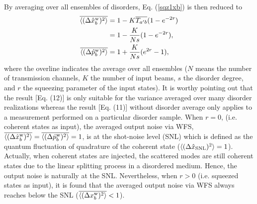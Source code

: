 \documentclass[9pt,twocolumn,twoside]{osajnl}
\begin{document}
By averaging over all ensembles of disorders, Eq. (\ref{sqz1xb}) is then reduced to
\begin{align}
\label{sqz1xbm}
\overline{\langle(\Delta \hat{x}_b^{\rm{w}})^2\rangle} &= 1 - K \overline{T_{a'b}} (1 - e^{-2r}) \\ \nonumber
&= 1 - \frac{K}{Ns} (1 - e^{-2r}), \\ \nonumber
\overline{\langle(\Delta \hat{p}_b^{\rm{w}})^2\rangle} &= 1 + \frac{K}{Ns}  (e^{2r} - 1),
\end{align}
where the overline indicates the average over all ensembles ($N$ means the number of transmission channels, $K$ the number of input beams, $s$ the disorder degree, and $r$ the squeezing parameter of the input states). It is worthy pointing out that the result [Eq. (12)] is only suitable for the variance averaged over many disorder realizations whereas the result [Eq. (11)] without disorder average only applies to a measurement performed on a particular disorder sample. When $r=0$, (i.e. coherent states as input), the averaged output noise via WFS, $\overline{\langle(\Delta \hat{x}_b^{\rm{w}})^2\rangle} = \overline{\langle(\Delta \hat{p}_b^{\rm{w}})^2\rangle} = 1$, is at the shot-noise level (SNL) which is defined as the quantum fluctuation of quadrature of the coherent state ($\langle(\Delta \hat{x}_{\rm{SNL}})^2\rangle = 1$). Actually, when coherent states are injected, the scattered modes are still coherent states due to the linear splitting process in a disordered medium. Hence, the output noise is naturally at the SNL. Nevertheless, when $r>0$ (i.e. squeezed states as input), it is found that the averaged output noise via WFS always reaches below the SNL ($\overline{\langle(\Delta x_b^{\rm{w}})^2\rangle}  < 1$).
\end{document}
